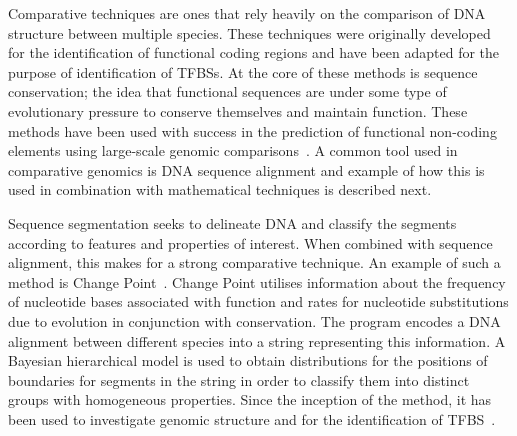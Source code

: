        Comparative techniques are ones that rely heavily on the comparison of DNA structure between multiple species.
        These techniques were originally developed for the identification of functional coding regions and have been adapted for the purpose of identification of TFBSs. At the core of these methods is sequence conservation; the idea that functional sequences are under some type of evolutionary pressure to conserve themselves and maintain function. These methods have been used with success in the prediction of functional non-coding elements using large-scale genomic comparisons~\cite{aparicio2002whole, gottgens2000analysis, loots2000identification, mouse2002initial}. A common tool used in comparative genomics is DNA sequence alignment and example of how this is used in combination with mathematical techniques is described next.

        
        Sequence segmentation seeks to delineate DNA and classify the segments according to features and properties of interest. When combined with sequence alignment, this makes for a strong comparative technique.
        An example of such a method is Change Point~\cite{keith2006segmenting}. Change Point utilises information about the frequency of nucleotide bases associated with function and rates for nucleotide substitutions due to evolution in conjunction with conservation. The program encodes a DNA alignment between different species into a string representing this information. A Bayesian hierarchical model is used to obtain distributions for the positions of boundaries for segments in the string in order to classify them into distinct groups with homogeneous properties. Since the inception of the method, it has been used to investigate genomic structure and for the identification of TFBS~\cite{algama2014investigating, algama2017genome}. 
        

